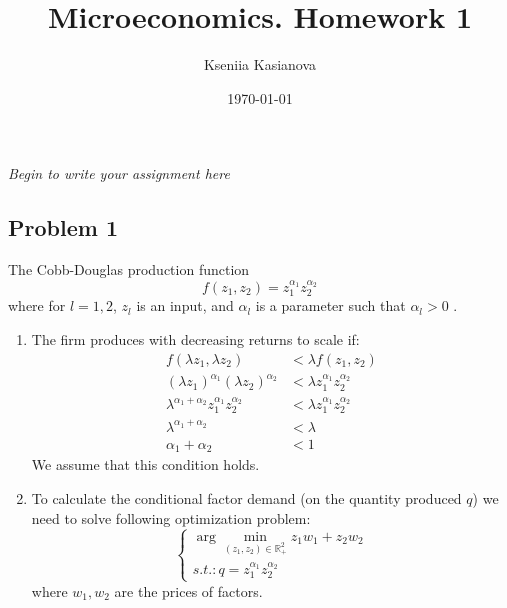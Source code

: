 \documentclass[a4paper,12pt]{article} %
\author{Kseniia Kasianova}
\title{Microeconomics. Homework 1}
\date{\today}
\newcommand{\latinword}[1]{\textsf{\itshape #1}}%
\begin{document}
{\color{blue} \latinword{Begin to write your assignment here}}

\noindent\makebox[\linewidth]{\rule{\textwidth}{0.4pt}}


\subsection*{Problem 1}

The Cobb-Douglas production function
\[ f(z_1, z_2) = z_1^{\alpha_1} z_2^{\alpha_2} \]
where for $ l = 1, 2 $, $ z_l $ is an input, and $ \alpha_l $ is a parameter such that $ \alpha_l > 0 $ .

\begin{enumerate}
	\item 	 The firm produces with decreasing returns to scale if: 
 \begin{align*}
	   f(\lambda z_1, \lambda z_2) &< \lambda f(z_1, z_2) \\
	   (\lambda z_1)^{\alpha_1} (\lambda z_2)^{\alpha_2} &< \lambda z_1^{\alpha_1} z_2^{\alpha_2} \\
	   \lambda^{\alpha_1 + \alpha_2} z_1^{\alpha_1} z_2^{\alpha_2} &< \lambda z_1^{\alpha_1} z_2^{\alpha_2} \\
	   	   \lambda^{\alpha_1 + \alpha_2}  &< \lambda \\
	   	   \alpha_1 + \alpha_2  &< 1
 \end{align*}
	 We assume  that this condition holds.
	\item To calculate the conditional factor demand (on the quantity produced
	$ q $) we need to solve following optimization problem: 
		\begin{equation}
	\begin{cases}
	\arg \min_{(z_1,z_2) \in \mathbb{R}^2_+  }{z_1 w_1 + z_2 w_2} \\ 
	s.t.: q =  z_1^{\alpha_1} z_2^{\alpha_2} 
	\end{cases} 
	\end{equation}
	where $ w_1, w_2 $ are the prices of factors. 
	 

\end{enumerate}
\end{document}
